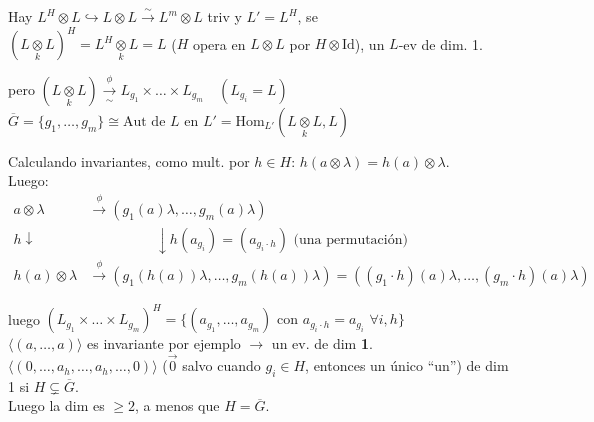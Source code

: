 \noindent Hay $L^H \otimes L \hookrightarrow L \otimes L \xrightarrow{\sim} L^m \otimes L$ triv y $L' = L^H$, se \\
$(L \underset{k}{\otimes} L)^H = L^H \underset{k}{\otimes} L = L$ ($H$ opera en $L \otimes L$ por $H \otimes \text{Id}$), un $L$-ev de dim. 1.

\noindent pero $(L \underset{k}{\otimes} L) \xrightarrow[\sim]{\phi} L_{g_1} \times \dots \times L_{g_m} \quad (L_{g_i} = L)$ \\
$\overline{G} = \{g_1, \dots, g_m\} \cong \text{Aut de } L \text{ en } L' = \text{Hom}_{L'} (L \underset{k}{\otimes} L, L)$

\noindent Calculando invariantes, como mult. por $h \in H$: $h(a \otimes \lambda) = h(a) \otimes \lambda$. \\
Luego: 
\begin{align*}
a \otimes \lambda &\xrightarrow{\phi} (g_1(a)\lambda, \dots, g_m(a)\lambda) \\
h \downarrow & \hspace{2cm} \downarrow h(a_{g_i}) = (a_{g_i \cdot h}) \text{ (una permutación)} \\
h(a) \otimes \lambda &\xrightarrow{\phi} (g_1(h(a))\lambda, \dots, g_m(h(a))\lambda) = ((g_1 \cdot h)(a)\lambda, \dots, (g_m \cdot h)(a)\lambda)
\end{align*}
\hfill \textcolor{red}{}

\noindent luego $(L_{g_1} \times \dots \times L_{g_m})^H = \{ (a_{g_1}, \dots, a_{g_m}) \text{ con } a_{g_i \cdot h} = a_{g_i} \,\, \forall i, h \}$ \\
$\langle (a, \dots, a) \rangle$ es invariante por ejemplo $\longrightarrow$ un ev. de dim \textbf{1}. \\
$\langle (0, \dots, a_h, \dots, a_h, \dots, 0) \rangle$ ($\vec{0}$ salvo cuando $g_i \in H$, entonces un único ``un'') de dim 1 si $H \subsetneq \overline{G}$. \\
Luego la dim es $\ge 2$, a menos que \underline{\underline{$H = \overline{G}$}}.

